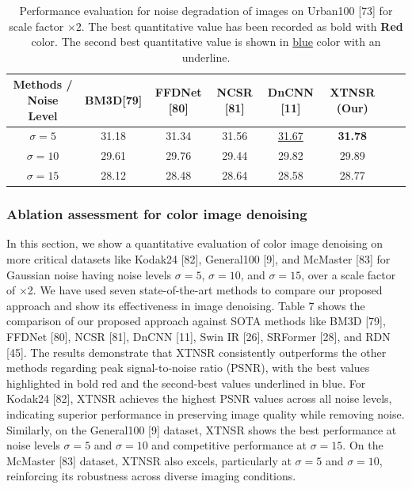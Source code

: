 \documentclass[twocolumn]{svjour3}          %
\begin{document}
\begin{table}
\centering
\caption{Performance evaluation for noise degradation of images on Urban100 [73] for scale factor $\times$2. The best quantitative value has been recorded as bold with {\color{red}\textbf{Red }} color. The second best quantitative value is shown in {\color{blue}\underline{blue}} color with an underline.}

\label{table4}
\setlength{\tabcolsep}{1 pt}
\begin{tabular}{|c|c|c|c|c|c|c|c|} %
\hline

\multirow{1}{*}{Methods / Noise Level} & \multirow{1}{*}{BM3D[79]} & \multirow{1}{*}{FFDNet [80]} & \multirow{1}{*}{NCSR [81]}  & \multirow{1}{*}{DnCNN [11]} & \multirow{1}{*}{XTNSR (Our)}\\

\hline
$\sigma = 5$ & {31.18} & {31.34} & {31.56} & {\color{blue}\underline{31.67}} & {\color{red}\textbf{31.78}}   \\
$\sigma = 10$ & {29.61} & {29.76} & {29.44} & {29.82} & {29.89}   \\
$\sigma = 15$ & {28.12} & {28.48} & {28.64} & {28.58} & {28.77}   \\
    
\hline
\end{tabular}
\end{table}

\subsubsection{Ablation assessment for color image denoising}

In this section, we show a quantitative evaluation of color image denoising on more critical datasets like Kodak24 [82], General100 [9], and McMaster [83] for Gaussian noise having noise levels $\sigma = 5$, $\sigma = 10$, and $\sigma = 15$, over a scale factor of ×2. We have used seven state-of-the-art methods to compare our proposed approach and show its effectiveness in image denoising. Table 7 shows the comparison of our proposed approach against SOTA methods like BM3D [79], FFDNet [80], NCSR [81], DnCNN [11], Swin IR [26], SRFormer [28], and RDN [45]. The results demonstrate that XTNSR consistently outperforms the other methods regarding peak signal-to-noise ratio (PSNR), with the best values highlighted in bold red and the second-best values underlined in blue. For Kodak24 [82], XTNSR achieves the highest PSNR values across all noise levels, indicating superior performance in preserving image quality while removing noise. Similarly, on the General100 [9] dataset, XTNSR shows the best performance at noise levels $\sigma = 5$ and $\sigma = 10$ and competitive performance at $\sigma = 15$. On the McMaster [83] dataset, XTNSR also excels, particularly at $\sigma = 5$ and $\sigma = 10$, reinforcing its robustness across diverse imaging conditions.
\end{document}
